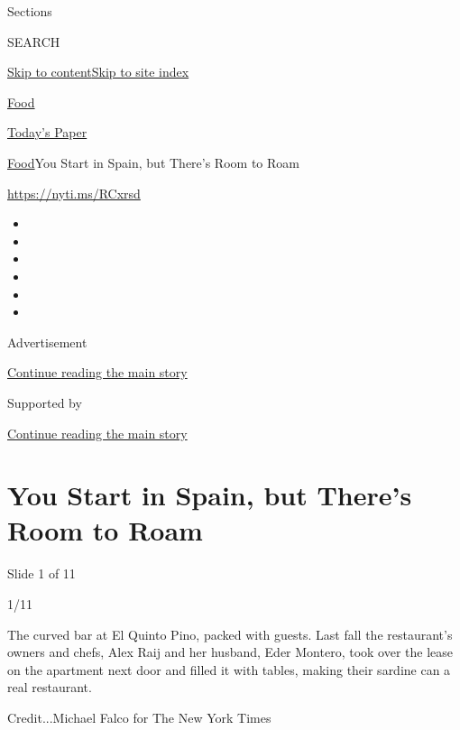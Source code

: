 Sections

SEARCH

\protect\hyperlink{site-content}{Skip to
content}\protect\hyperlink{site-index}{Skip to site index}

\href{https://www.nytimes3xbfgragh.onion/section/food}{Food}

\href{https://myaccount.nytimes3xbfgragh.onion/auth/login?response_type=cookie\&client_id=vi}{}

\href{https://www.nytimes3xbfgragh.onion/section/todayspaper}{Today's
Paper}

\href{/section/food}{Food}\textbar{}You Start in Spain, but There's Room
to Roam

\url{https://nyti.ms/RCxrsd}

\begin{itemize}
\item
\item
\item
\item
\item
\item
\end{itemize}

Advertisement

\protect\hyperlink{after-top}{Continue reading the main story}

Supported by

\protect\hyperlink{after-sponsor}{Continue reading the main story}

\hypertarget{you-start-in-spain-but-theres-room-to-roam}{%
\section{You Start in Spain, but There's Room to
Roam}\label{you-start-in-spain-but-theres-room-to-roam}}

Slide 1 of 11

1/11

The curved bar at El Quinto Pino, packed with guests. Last fall the
restaurant's owners and chefs, Alex Raij and her husband, Eder Montero,
took over the lease on the apartment next door and filled it with
tables, making their sardine can a real restaurant.

Credit...Michael Falco for The New York Times


